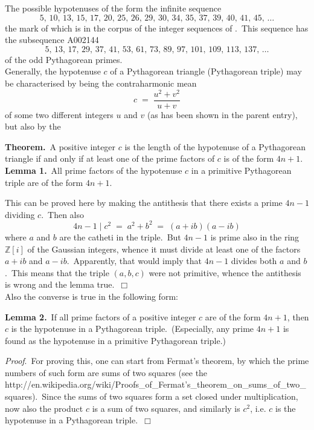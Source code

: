 \documentclass[12pt]{article}
\begin{document}
The possible hypotenuses of the 
 form the
infinite sequence
$$5,\,10,\,13,\,15,\,17,\,20,\,25,\,26,\,29,\,30,\,34,\,35,\,
37,\,39,\,40,\,41,\,45,\,\ldots$$
the mark of which is 
 in the corpus of the integer 
sequences of .\, This sequence has the subsequence A002144
$$5,\,13,\,17,\,29,\,37,\,41,\,53,\,61,\,73,\,89,\,97,\,
101,\,109,\,113,\,137,\,\ldots$$
of the odd Pythagorean primes.\\


Generally, the hypotenuse $c$ of a Pythagorean triangle 
(Pythagorean triple) may be characterised by being the 
contraharmonic mean 
$$c \;=\; \frac{u^2\!+\!v^2}{u\!+\!v}$$
of some two different integers $u$ and $v$ (as has been shown 
in the parent entry), but also by the

\textbf{Theorem.}\, A positive integer $c$ is the length of the 
hypotenuse of a Pythagorean triangle if and only if at least 
one of the prime factors of $c$ is of the form $4n\!+\!1$.\\


\textbf{Lemma 1.}\, All prime factors of the hypotenuse $c$ in 
a primitive Pythagorean triple are of the form $4n\!+\!1$.  

This can be proved here by making the antithesis that there 
exists a prime $4n\!-\!1$ dividing $c$.\, Then also
$$4n\!-\!1 \mid c^2 \;=\; a^2\!+\!b^2 
\;=\; (a\!+\!ib)(a\!-\!ib)$$
where $a$ and $b$ are the catheti in the triple.\, But $4n\!-\!1$ 
is prime also in the ring $\mathbb{Z}[i]$ of the Gaussian 
integers, whence it must divide at least one of the factors 
$a\!+\!ib$ and $a\!-\!ib$.\, Apparently, that would imply that 
$4n\!-\!1$ divides both $a$ and $b$.\, This means that the 
triple $(a, b, c)$ were not primitive, whence 
the antithesis is wrong and the lemma true.\, $\Box$\\

Also the converse is true in the following form:

\textbf{Lemma 2.}\, If all prime factors of a positive integer 
$c$ are of the form $4n\!+\!1$, then $c$ is the hypotenuse in 
a Pythagorean triple.\, (Especially, any prime $4n\!+\!1$ is 
found as the hypotenuse in a primitive Pythagorean triple.)

{\it Proof}.\, For proving this, one can start from Fermat{'}s 
theorem, by which the prime numbers of such form are sums of 
two squares (see the 
{http://en.wikipedia.org/wiki/Proofs_of_Fermat's_theorem_on_sums_of_two_squares}).\, 
Since the sums of two squares form a set closed under 
multiplication, now also the product $c$ is a sum of two 
squares, and similarly is $c^2$, i.e. $c$ is the hypotenuse 
in a Pythagorean triple.\, $\Box$\\
\end{document}
